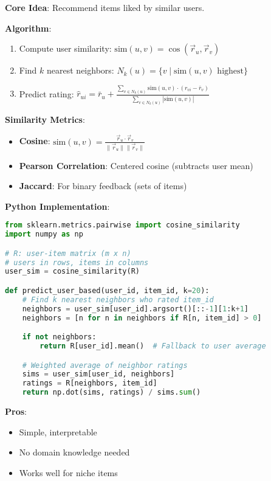 \documentclass[10pt]{article}
\begin{document}
\textbf{Core Idea}: Recommend items liked by similar users.

\textbf{Algorithm}:
\begin{enumerate}[leftmargin=*]
    \item Compute user similarity: $\text{sim}(u, v) = \cos(\vec{r}_u, \vec{r}_v)$
    \item Find $k$ nearest neighbors: $N_k(u) = \{v \mid \text{sim}(u,v) \text{ highest}\}$
    \item Predict rating: $\hat{r}_{ui} = \bar{r}_u + \frac{\sum_{v \in N_k(u)} \text{sim}(u,v) \cdot (r_{vi} - \bar{r}_v)}{\sum_{v \in N_k(u)} |\text{sim}(u,v)|}$
\end{enumerate}

\textbf{Similarity Metrics}:
\begin{itemize}[leftmargin=*]
    \item \textbf{Cosine}: $\text{sim}(u,v) = \frac{\vec{r}_u \cdot \vec{r}_v}{\|\vec{r}_u\| \|\vec{r}_v\|}$
    \item \textbf{Pearson Correlation}: Centered cosine (subtracts user mean)
    \item \textbf{Jaccard}: For binary feedback (sets of items)
\end{itemize}

\textbf{Python Implementation}:
\begin{lstlisting}[language=Python]
from sklearn.metrics.pairwise import cosine_similarity
import numpy as np

# R: user-item matrix (m x n)
# users in rows, items in columns
user_sim = cosine_similarity(R)

def predict_user_based(user_id, item_id, k=20):
    # Find k nearest neighbors who rated item_id
    neighbors = user_sim[user_id].argsort()[::-1][1:k+1]
    neighbors = [n for n in neighbors if R[n, item_id] > 0]

    if not neighbors:
        return R[user_id].mean()  # Fallback to user average

    # Weighted average of neighbor ratings
    sims = user_sim[user_id, neighbors]
    ratings = R[neighbors, item_id]
    return np.dot(sims, ratings) / sims.sum()
\end{lstlisting}

\textbf{Pros}:
\begin{itemize}[leftmargin=*]
    \item Simple, interpretable
    \item No domain knowledge needed
    \item Works well for niche items
\end{itemize}
\end{document}
